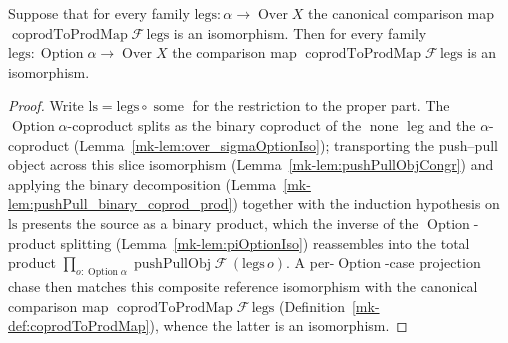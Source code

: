 \begin{lemma}
  \label{mk-lem:coprodToProd_isIso_option}

  Suppose that for every family \(\mathrm{legs} : \alpha \to \operatorname{Over} X\) the canonical
  comparison map \(\operatorname{coprodToProdMap}\mathcal{F}\,\mathrm{legs}\) is an isomorphism. Then for
  every family \(\mathrm{legs} : \operatorname{Option}\alpha \to \operatorname{Over} X\) the comparison
  map \(\operatorname{coprodToProdMap}\mathcal{F}\,\mathrm{legs}\) is an isomorphism.
\end{lemma}
\begin{proof}
  Write \(\mathrm{ls} = \mathrm{legs} \circ \operatorname{some}\) for the restriction to the proper
  part. The \(\operatorname{Option}\alpha\)-coproduct splits as the binary coproduct of the
  \(\operatorname{none}\) leg and the \(\alpha\)-coproduct (Lemma~\ref{mk-lem:over_sigmaOptionIso});
  transporting the push--pull object across this slice isomorphism (Lemma~\ref{mk-lem:pushPullObjCongr})
  and applying the binary decomposition (Lemma~\ref{mk-lem:pushPull_binary_coprod_prod}) together with the
  induction hypothesis on \(\mathrm{ls}\) presents the source as a binary product, which the inverse of
  the \(\operatorname{Option}\)-product splitting (Lemma~\ref{mk-lem:piOptionIso}) reassembles into the
  total product \(\prod_{o : \operatorname{Option}\alpha} \operatorname{pushPullObj}\mathcal{F}\,
  (\mathrm{legs}\,o)\). A per-\(\operatorname{Option}\)-case projection chase then matches this composite
  reference isomorphism with the canonical comparison map
  \(\operatorname{coprodToProdMap}\mathcal{F}\,\mathrm{legs}\) (Definition~\ref{mk-def:coprodToProdMap}),
  whence the latter is an isomorphism.
\end{proof}

